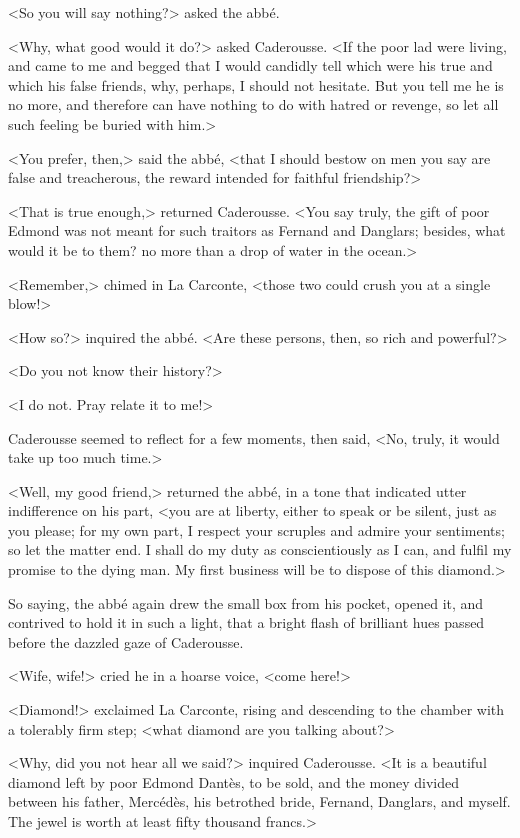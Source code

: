  <So you will say nothing?> asked the abbé. 

 <Why, what good would it do?> asked Caderousse. <If the poor lad were living, and came to me and begged that I would candidly tell which were his true and which his false friends, why, perhaps, I should not hesitate. But you tell me he is no more, and therefore can have nothing to do with hatred or revenge, so let all such feeling be buried with him.> 

 <You prefer, then,> said the abbé, <that I should bestow on men you say are false and treacherous, the reward intended for faithful friendship?> 

 <That is true enough,> returned Caderousse. <You say truly, the gift of poor Edmond was not meant for such traitors as Fernand and Danglars; besides, what would it be to them? no more than a drop of water in the ocean.> 

 <Remember,> chimed in La Carconte, <those two could crush you at a single blow!> 

 <How so?> inquired the abbé. <Are these persons, then, so rich and powerful?> 

 <Do you not know their history?> 

 <I do not. Pray relate it to me!> 

 Caderousse seemed to reflect for a few moments, then said, <No, truly, it would take up too much time.> 

 <Well, my good friend,> returned the abbé, in a tone that indicated utter indifference on his part, <you are at liberty, either to speak or be silent, just as you please; for my own part, I respect your scruples and admire your sentiments; so let the matter end. I shall do my duty as conscientiously as I can, and fulfil my promise to the dying man. My first business will be to dispose of this diamond.> 

 So saying, the abbé again drew the small box from his pocket, opened it, and contrived to hold it in such a light, that a bright flash of brilliant hues passed before the dazzled gaze of Caderousse. 

 <Wife, wife!> cried he in a hoarse voice, <come here!> 

 <Diamond!> exclaimed La Carconte, rising and descending to the chamber with a tolerably firm step; <what diamond are you talking about?> 

 <Why, did you not hear all we said?> inquired Caderousse. <It is a beautiful diamond left by poor Edmond Dantès, to be sold, and the money divided between his father, Mercédès, his betrothed bride, Fernand, Danglars, and myself. The jewel is worth at least fifty thousand francs.> 


